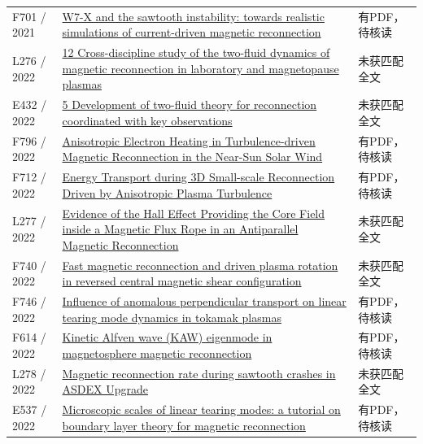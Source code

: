 \documentclass[UTF8,a4paper,11pt,openany,fontset=fandol]{ctexbook}
\begin{document}
\begin{longtable}{P{24mm}P{97mm}P{27mm}}
F701 / 2021 & \href{https://doi.org/10.1088/1741-4326/ac077d}{W7-X and the sawtooth instability: towards realistic simulations of current-driven magnetic reconnection} & 有PDF，待核读\\

L276 / 2022 & \href{https://doi.org/10.2307/j.ctv1w7v22j.15}{12 Cross-discipline study of the two-fluid dynamics of magnetic reconnection in laboratory and magnetopause plasmas} & 未获匹配全文\\

E432 / 2022 & \href{https://doi.org/10.2307/j.ctv1w7v22j.8}{5 Development of two-fluid theory for reconnection coordinated with key observations} & 未获匹配全文\\

F796 / 2022 & \href{https://doi.org/10.3847/1538-4357/ac7da6}{Anisotropic Electron Heating in Turbulence-driven Magnetic Reconnection in the Near-Sun Solar Wind} & 有PDF，待核读\\

F712 / 2022 & \href{https://doi.org/10.3847/1538-4357/ac8667}{Energy Transport during 3D Small-scale Reconnection Driven by Anisotropic Plasma Turbulence} & 有PDF，待核读\\

L277 / 2022 & \href{https://doi.org/10.3847/1538-4357/aca27f}{Evidence of the Hall Effect Providing the Core Field inside a Magnetic Flux Rope in an Antiparallel Magnetic Reconnection} & 未获匹配全文\\

F740 / 2022 & \href{https://doi.org/10.1088/1741-4326/ac984f}{Fast magnetic reconnection and driven plasma rotation in reversed central magnetic shear configuration} & 未获匹配全文\\

F746 / 2022 & \href{https://doi.org/10.1063/5.0082331}{Influence of anomalous perpendicular transport on linear tearing mode dynamics in tokamak plasmas} & 有PDF，待核读\\

F614 / 2022 & \href{https://doi.org/10.1007/s41614-022-00107-y}{Kinetic Alfven wave (KAW) eigenmode in magnetosphere magnetic reconnection} & 有PDF，待核读\\

L278 / 2022 & \href{https://doi.org/10.1088/1741-4326/ac6617}{Magnetic reconnection rate during sawtooth crashes in ASDEX Upgrade} & 未获匹配全文\\

E537 / 2022 & \href{https://doi.org/10.1017/s0022377822001088}{Microscopic scales of linear tearing modes: a tutorial on boundary layer theory for magnetic reconnection} & 有PDF，待核读\\


\end{longtable}
\end{document}
